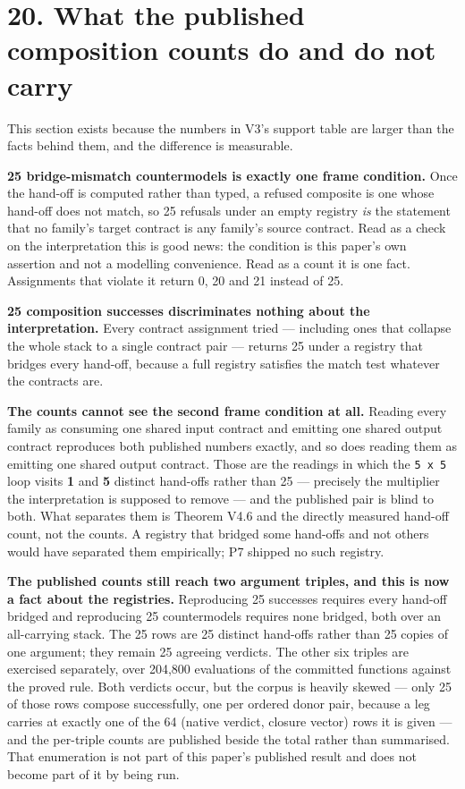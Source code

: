\section{20. What the published composition counts do and do not carry}

This section exists because the numbers in V3's support table are larger than
the facts behind them, and the difference is measurable.

\textbf{25 bridge-mismatch countermodels is exactly one frame condition.} Once the
hand-off is computed rather than typed, a refused composite is one whose
hand-off does not match, so 25 refusals under an empty registry \emph{is} the
statement that no family's target contract is any family's source contract. Read
as a check on the interpretation this is good news: the condition is this paper's own
assertion and not a modelling convenience. Read as a count it is one fact.
Assignments that violate it return 0, 20 and 21 instead of 25.

\textbf{25 composition successes discriminates nothing about the interpretation.}
Every contract assignment tried --- including ones that collapse the whole stack to
a single contract pair --- returns 25 under a registry that bridges every hand-off,
because a full registry satisfies the match test whatever the contracts are.

\textbf{The counts cannot see the second frame condition at all.} Reading every family
as consuming one shared input contract and emitting one shared output contract
reproduces both published numbers exactly, and so does reading them as emitting
one shared output contract. Those are the readings in which the \texttt{5 x 5} loop
visits \textbf{1} and \textbf{5} distinct hand-offs rather than 25 --- precisely the
multiplier the interpretation is supposed to remove --- and the published pair is
blind to both. What separates them is Theorem V4.6 and the directly measured
hand-off count, not the counts. A registry that bridged some hand-offs and not
others would have separated them empirically; P7 shipped no such registry.

\textbf{The published counts still reach two argument triples, and this is now a fact
about the registries.} Reproducing 25 successes requires every hand-off bridged
and reproducing 25 countermodels requires none bridged, both over an all-carrying
stack. The 25 rows are 25 distinct hand-offs rather than 25 copies of one
argument; they remain 25 agreeing verdicts. The other six triples are exercised
separately, over 204,800 evaluations of the committed functions against the
proved rule. Both verdicts occur, but the corpus is heavily skewed --- only 25 of
those rows compose successfully, one per ordered donor pair, because a leg
carries at exactly one of the 64 (native verdict, closure vector) rows it is
given --- and the per-triple counts are published beside the total rather than
summarised. That enumeration is not part
of this paper's published result and does not become part of it by being run.
